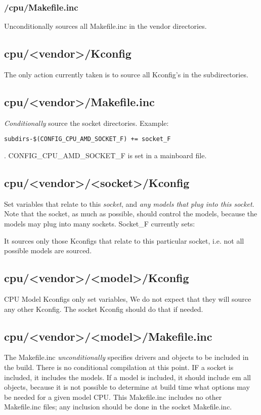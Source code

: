 \documentclass[10pt,letterpaper]{article}
\begin{document}
\subsubsection{ /cpu/Makefile.inc}
Unconditionally sources all Makefile.inc in the vendor directories. 

\subsection{cpu/<vendor>/Kconfig}
The only action currently taken is to source all Kconfig's in the 
subdirectories. 
\subsection{cpu/<vendor>/Makefile.inc}
{\em Conditionally} source the socket directories. 
Example: 
\begin{verbatim}
subdirs-$(CONFIG_CPU_AMD_SOCKET_F) += socket_F
\end{verbatim}
.
CONFIG\_CPU\_AMD\_SOCKET\_F is set in a mainboard file. 

\subsection{cpu/<vendor>/<socket>/Kconfig}
Set variables that relate to this {\em socket}, and {\em any models that plug into this socket}. Note that 
the socket, as much as possible, should control the models, because the models may plug into many sockets. 
Socket\_F currently sets: 


It sources only those Kconfigs that relate to this particular socket, i.e. not all possible models are sourced. 

\subsection{cpu/<vendor>/<model>/Kconfig}
CPU Model Kconfigs only set variables, We do not expect that they will source any other Kconfig. The socket Kconfig should do that
if needed. 
\subsection{cpu/<vendor>/<model>/Makefile.inc}
The Makefile.inc {\em unconditionally} specifies drivers and objects to be included in the build. There is no conditional 
compilation at this point. IF a socket is included, it includes the models. If a model is included, it should include {em all} 
objects, because it is not possible to determine at build time what options may be needed for a given model CPU. 
This Makefile.inc includes no other Makefile.inc files; any inclusion should be done in the socket Makefile.inc.
\end{document}
